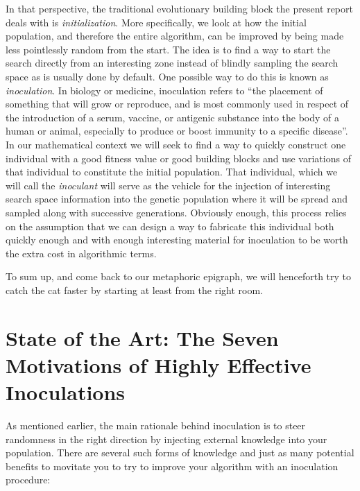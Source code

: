 \documentclass[english]{DESCARWINreport}
\begin{document}
In that perspective, the traditional evolutionary building block the present report deals with is \emph{initialization}. More specifically, we look at how the initial population, and therefore the entire algorithm, can be improved by being made less pointlessly random from the start. The idea is to find a way to start the search directly from an interesting zone instead of blindly sampling the search space as is usually done by default. One possible way to do this is known as \emph{inoculation}. In biology or medicine, inoculation refers to "`the placement of something that will grow or reproduce, and is most commonly used in respect of the introduction of a serum, vaccine, or antigenic substance into the body of a human or animal, especially to produce or boost immunity to a specific disease"'. In our mathematical context we will seek to find a way to quickly construct one individual with a good fitness value or good building blocks and use variations of that individual to constitute the initial population. That individual, which we will call the \emph{inoculant} will serve as the vehicle for the injection of interesting search space information into the genetic population where it will be spread and sampled along with successive generations.  Obviously enough, this process relies on the assumption that we can design a way to fabricate this individual both quickly enough and with enough interesting material for inoculation to be worth the extra cost in algorithmic terms.

To sum up, and come back to our metaphoric epigraph, we will henceforth try to catch the cat faster by starting at least from the right room.

\section{State of the Art: The Seven Motivations of Highly Effective Inoculations}


As mentioned earlier, the main rationale behind inoculation is to steer randomness in the right direction by injecting external knowledge into your population. There are several such forms of knowledge and just as many potential benefits to movitate you to try to improve your algorithm with an inoculation procedure:
\end{document}
